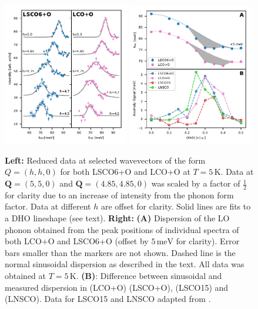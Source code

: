 \begin{figure}
    \centering
    \includegraphics[width=0.49\textwidth]{fig/anomaly/fig2.pdf}
    \includegraphics[width=0.49\textwidth]{fig/anomaly/fig3.pdf}
    \caption[Phonon anomaly data and dispersion]{\textbf{Left:} Reduced data at selected wavevectors of the form $Q=(h,h,0)$ for both LSCO6+O and LCO+O at $T=5\,\text{K}$. Data at $\bm{Q}=(5,5,0)$ and $\bm{Q}=(4.85,4.85,0)$ was scaled by a factor of $\frac{1}{2}$ for clarity due to an increase of intensity from the phonon form factor. Data at different $h$ are offset for clarity. Solid lines are fits to a DHO lineshape (see text). \textbf{Right:} \textbf{(A)} Dispersion of the LO phonon obtained from the peak positions of individual spectra of both LCO+O and LSCO6+O (offset by $5\,\text{meV}$ for clarity). Error bars smaller than the markers are not shown. Dashed line is the normal sinusoidal dispersion as described in the text. All data was obtained at $T= 5 \, \text{K}$. \textbf{(B)}: Difference between sinusoidal and measured dispersion in \LCOO{} (LCO+O) \LSCOO{} (LSCO+O), \LSCOopt{} (LSCO15) and \LNSCO{} (LNSCO). Data for LSCO15 and LNSCO adapted from \cite{Reznik2007}.}
    \label{fig:anomaly_data_dispersion}
\end{figure}

